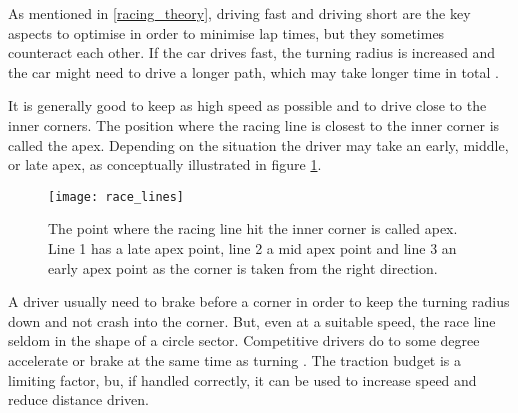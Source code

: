 


As mentioned in \ref{racing_theory}, driving fast and driving short are the key aspects to optimise in order to minimise lap times, but they sometimes counteract each other. If the car drives fast, the turning radius is increased and the car might need to drive a longer path, which may take longer time in total \cite{edmondson}. 

It is generally good to keep as high speed as possible and to drive close to the inner corners. The position where the racing line is closest to the inner corner is called the apex. Depending on the situation the driver may take an early, middle, or late apex, as conceptually illustrated in figure \ref{figure:apex_variants}.

\begin{figure}[H]
    \centering
    \texttt{[image: race\_lines]}
    \caption{The point where the racing line hit the inner corner is called apex. Line 1 has a late apex point, line 2 a mid apex point and line 3 an early apex point as the corner is taken from the right direction.}
    \label{figure:apex_variants}
\end{figure}

\noindent
A driver usually need to brake before a corner in order to keep the turning radius down and not crash into the corner. But, even at a suitable speed, the race line seldom in the shape of a circle sector. Competitive drivers do to some degree accelerate or brake at the same time as turning \cite{edmondson}. The traction budget is a limiting factor, bu, if handled correctly, it can be used to increase speed and reduce distance driven. 

